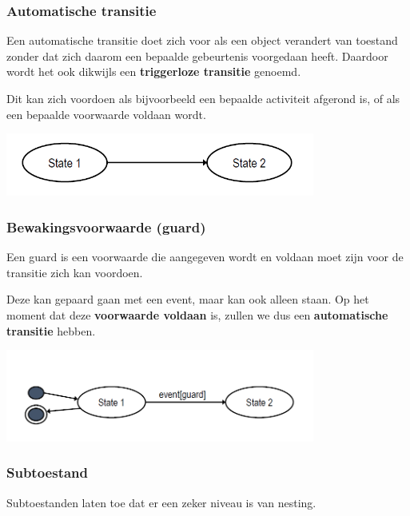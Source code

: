 \subsubsection{Automatische transitie}

Een automatische transitie doet zich voor als een object verandert van toestand zonder dat zich daarom een bepaalde gebeurtenis voorgedaan heeft. Daardoor wordt het ook dikwijls een \textbf{triggerloze transitie} genoemd.

Dit kan zich voordoen als bijvoorbeeld een bepaalde activiteit afgerond is, of als een bepaalde voorwaarde voldaan wordt.


\begin{center}
\includegraphics[width=4in]{img/state5}%
\end{center}

\subsubsection{Bewakingsvoorwaarde (guard)}

Een guard is een voorwaarde die aangegeven wordt en voldaan moet zijn voor de transitie zich kan voordoen. 

Deze kan gepaard gaan met een event, maar kan ook alleen staan. Op het moment dat deze \textbf{voorwaarde voldaan} is, zullen we dus een \textbf{automatische transitie} hebben.


\begin{center}
\includegraphics[width=4in]{img/state6}%
\end{center}
\newpage
\subsubsection{Subtoestand}

Subtoestanden laten toe dat er een zeker niveau is van nesting. 

